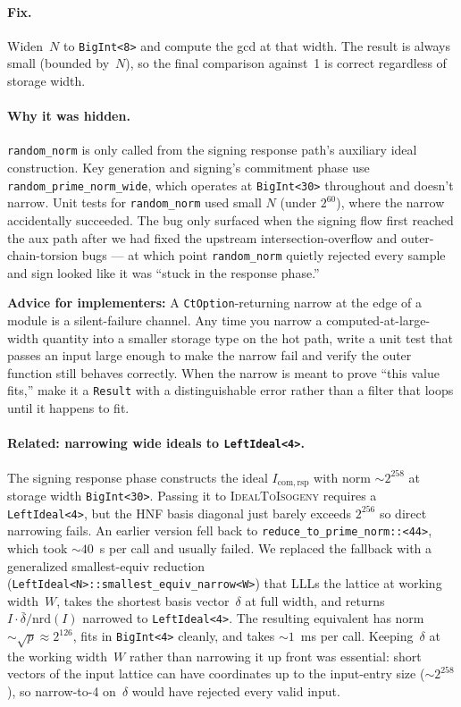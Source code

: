 \paragraph{Fix.}  Widen~$N$ to \texttt{BigInt<8>} and compute the
gcd at that width.  The result is always small (bounded by~$N$), so
the final comparison against~1 is correct regardless of storage
width.

\paragraph{Why it was hidden.}  \texttt{random\_norm} is only
called from the signing response path's auxiliary ideal
construction.  Key generation and signing's commitment phase use
\texttt{random\_prime\_norm\_wide}, which operates at
\texttt{BigInt<30>} throughout and doesn't narrow.  Unit tests for
\texttt{random\_norm} used small $N$ (under $2^{60}$), where the
narrow accidentally succeeded.  The bug only surfaced when the
signing flow first reached the aux path after we had fixed the
upstream intersection-overflow and outer-chain-torsion bugs --- at
which point \texttt{random\_norm} quietly rejected every sample
and sign looked like it was ``stuck in the response phase.''

\noindent
\textbf{Advice for implementers:} A \texttt{CtOption}-returning narrow at the edge
of a module is a silent-failure channel.  Any time you narrow a
computed-at-large-width quantity into a smaller storage type on
the hot path, write a unit test that passes an input large enough
to make the narrow fail and verify the outer function still
behaves correctly.  When the narrow is meant to prove ``this
value fits,'' make it a \texttt{Result} with a distinguishable
error rather than a filter that loops until it happens to fit.

\paragraph{Related: narrowing wide ideals to
  \texttt{LeftIdeal<4>}.}  The signing response phase constructs
the ideal \(I_{\mathrm{com,rsp}}\) with norm ${\sim}2^{258}$ at
storage width \texttt{BigInt<30>}.  Passing it to
\textsc{IdealToIsogeny} requires a \texttt{LeftIdeal<4>}, but the
HNF basis diagonal just barely exceeds $2^{256}$ so direct
narrowing fails.  An earlier version fell back to
\texttt{reduce\_to\_prime\_norm::<44>}, which took ${\sim}40$~s
per call and usually failed.  We replaced the fallback with a
generalized smallest-equiv reduction
(\texttt{LeftIdeal<N>::smallest\_equiv\_narrow<W>}) that LLLs the
lattice at working width~$W$, takes the shortest basis vector~$\delta$
at full width, and returns \(I \cdot \bar\delta / \mathrm{nrd}(I)\)
narrowed to \texttt{LeftIdeal<4>}.  The resulting equivalent has
norm~${\sim}\sqrt{p} \approx 2^{126}$, fits in \texttt{BigInt<4>}
cleanly, and takes ${\sim}1$~ms per call.  Keeping~$\delta$ at the
working width~$W$ rather than narrowing it up front was essential:
short vectors of the input lattice can have coordinates
up to the input-entry size (${\sim}2^{258}$), so narrow-to-4 on~$\delta$
would have rejected every valid input.

